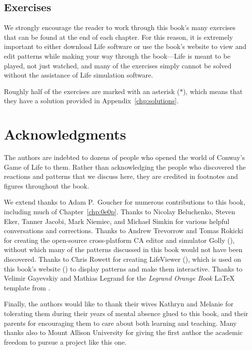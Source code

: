 \subsection*{Exercises}

We strongly encourage the reader to work through this book's many exercises that can be found at the end of each chapter. For this reason, it is extremely important to either download Life software or use the book's website to view and edit patterns while making your way through the book---Life is meant to be played, not just watched, and many of the exercises simply cannot be solved without the assistance of Life simulation software.

Roughly half of the exercises are marked with an asterisk ($\ast$), which means that they have a solution provided in Appendix~\ref{chp:solutions}.


\section*{Acknowledgments}

The authors are indebted to dozens of people who opened the world of Conway's Game of Life to them. Rather than acknowledging the people who discovered the reactions and patterns that we discuss here, they are credited in footnotes and figures throughout the book.

We extend thanks to Adam P.~Goucher for numerous contributions to this book, including much of Chapter~\ref{chp:0e0p}. Thanks to Nicolay Beluchenko, Steven Eker, Tanner Jacobi, Mark Niemiec, and Michael Simkin for various helpful conversations and corrections. Thanks to Andrew Trevorrow and Tomas Rokicki for creating the open-source cross-platform CA editor and simulator Golly (), without which many of the patterns discussed in this book would not have been discovered. Thanks to Chris Rowett for creating LifeViewer (), which is used on this book's website () to display patterns and make them interactive. Thanks to Velimir Gayevskiy and Mathias Legrand for the \emph{Legrand Orange Book} LaTeX template from .

Finally, the authors would like to thank their wives Kathryn and Melanie for tolerating them during their years of mental absence glued to this book, and their parents for encouraging them to care about both learning and teaching. Many thanks also to Mount Allison University for giving the first author the academic freedom to pursue a project like this one.
